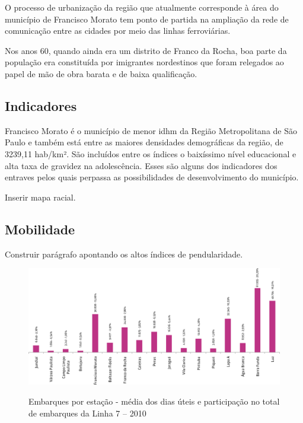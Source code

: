	O processo de urbanização da região que atualmente corresponde à área do município de Francisco Morato tem ponto de partida na ampliação da rede de comunicação entre as cidades por meio das linhas ferroviárias.
	
	Nos anos 60, quando ainda era um distrito de Franco da Rocha, boa parte da população era constituída por imigrantes nordestinos que foram relegados ao papel de mão de obra barata e de baixa qualificação.
	
	\subsection{Indicadores}
	
	Francisco Morato é o município de menor \gls{idhm} da Região Metropolitana de São Paulo e também está entre as maiores densidades demográficas da região, de 3239,11 hab/km². São incluídos entre os índices o baixíssimo nível educacional e alta taxa de gravidez na adolescência. Esses são alguns dos indicadores dos entraves pelos quais perpassa as possibilidades de desenvolvimento do município.
	
	Inserir mapa racial.
	
	\subsection{Mobilidade} \label{Mobilidade}
	
	Construir parágrafo apontando os altos índices de pendularidade.
	
	\begin{figure}[!htb]
		\centering
		\caption[Embarques por estação da Linha 7 - 2010]{Embarques por estação - média dos dias úteis e participação no total de embarques da Linha 7 – 2010}
		\includegraphics[width=\linewidth]{img/pdcptm_57a}
		\label{fig:pdcptm_57a}
	\end{figure}
    
